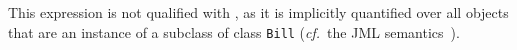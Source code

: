 This expression is not qualified with , as it is
implicitly quantified over all objects that are an instance of a
subclass of class \texttt{Bill} (\emph{cf.}\ the JML
semantics~\cite[\S 8.2]{JMLReferenceManual05}).


	



